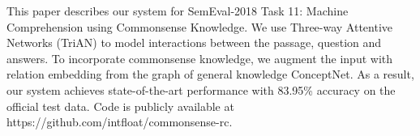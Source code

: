 This paper describes our system for SemEval-2018 Task 11: Machine Comprehension using Commonsense Knowledge. We use Three-way Attentive Networks (TriAN) to model interactions between the passage, question and answers. To incorporate commonsense knowledge, we augment the input with relation embedding from the graph of general knowledge ConceptNet. As a result, our system achieves state-of-the-art performance with 83.95\% accuracy on the official test data. Code is publicly available at https://github.com/intfloat/commonsense-rc.
